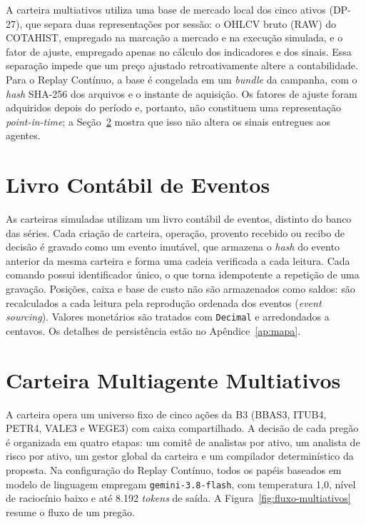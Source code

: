 A carteira multiativos utiliza uma base de mercado local dos cinco ativos (\mbox{DP-27}), que separa duas representações por sessão: o OHLCV bruto (RAW) do COTAHIST, empregado na marcação a mercado e na execução simulada, e o fator de ajuste, empregado apenas no cálculo dos indicadores e dos sinais. Essa separação impede que um preço ajustado retroativamente altere a contabilidade. Para o Replay Contínuo, a base é congelada em um \textit{bundle} da campanha, com o \textit{hash} SHA-256 dos arquivos e o instante de aquisição. Os fatores de ajuste foram adquiridos depois do período e, portanto, não constituem uma representação \textit{point-in-time}; a Seção~\ref{sec:arq-multiativos} mostra que isso não altera os sinais entregues aos agentes.

\section{Livro Contábil de Eventos}
\label{sec:arq-livro}

As carteiras simuladas utilizam um livro contábil de eventos, distinto do banco das séries. Cada criação de carteira, operação, provento recebido ou recibo de decisão é gravado como um evento imutável, que armazena o \textit{hash} do evento anterior da mesma carteira e forma uma cadeia verificada a cada leitura. Cada comando possui identificador único, o que torna idempotente a repetição de uma gravação. Posições, caixa e base de custo não são armazenados como saldos: são recalculados a cada leitura pela reprodução ordenada dos eventos (\textit{event sourcing}). Valores monetários são tratados com \texttt{Decimal} e arredondados a centavos. Os detalhes de persistência estão no Apêndice~\ref{ap:mapa}.

\section{Carteira Multiagente Multiativos}
\label{sec:arq-multiativos}

A carteira opera um universo fixo de cinco ações da B3 (BBAS3, ITUB4, PETR4, VALE3 e WEGE3) com caixa compartilhado. A decisão de cada pregão é organizada em quatro etapas: um comitê de analistas por ativo, um analista de risco por ativo, um gestor global da carteira e um compilador determinístico da proposta. Na configuração do Replay Contínuo, todos os papéis baseados em modelo de linguagem empregam \texttt{gemini-3.8-flash}, com temperatura 1,0, nível de raciocínio baixo e até 8.192 \textit{tokens} de saída. A Figura~\ref{fig:fluxo-multiativos} resume o fluxo de um pregão.

